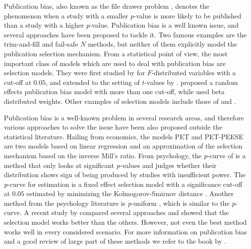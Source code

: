 \documentclass[useAMS,usenatbib,referee]{biom}
\begin{document}
Publication bias, also known as the file drawer problem \citep[see, e.g.,][]{iyengar1988selection}, denotes the phenomenon when a study with a smaller \textit{p}-value is more likely to be published than a study with a higher \textit{p}-value. Publication bias is a well known issue, and several approaches have been proposed to tackle it. Two famous examples are the trim-and-fill \citep{duval2000trim} and fail-safe $N$ \citep{becker2005failsafe} methods, but neither of them explicitly model the publication selection mechanism. From a statistical point of view, the most important class of models which are used to deal with publication bias are selection models. They were first studied by \citet{hedges1984estimation} for $F$-distributed variables with a cut-off at $0.05$, and extended to the setting of $t$-values by \citet{iyengar1988selection}. \citet{hedges1992modeling} proposed a random effects publication bias model with more than one cut-off, while \citet{citkowicz2017parsimonious} used beta distributed weights. Other examples of selection models include those of \cite{dear1992approach} and \cite{CopasShi2000}.

Publication bias is a well-known problem in several research areas, and therefore various approaches to solve the issue have been also proposed outside the statistical literature. Hailing from economics, the models PET and PET-PEESE \citep{stanley2014meta} are two models based on linear regression and an approximation of the selection mechanism based on the inverse Mill's ratio. From psychology, the \textit{p}-curve of \citet{simonsohn2014p} is a method that only looks at significant \textit{p}-values and judges whether their distribution shows sign of being produced by studies with insufficient power. The \textit{p}-curve for estimation \citep{simonsohn2014} is a fixed effect selection model with a significance cut-off at $0.05$ estimated by minimizing the Kolmogorov-Smirnov distance \citep{mcshane2016adjusting}. Another method from the psychology literature is \textit{p}-uniform \citep{van2015meta}, which is similar to the \textit{p}-curve. A recent study by \citet{carter2019correcting} compared several approaches and showed that the selection model works better than the others. However, not even the best method works well in every considered scenario. For more information on publication bias and a good review of large part of these methods we refer to the book by \citet{rothstein2006publication}.
\end{document}
